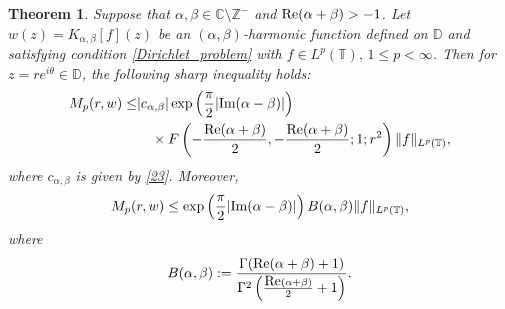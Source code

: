 \documentclass[11pt, reqno]{amsart}
\newtheorem{theorem}{Theorem}
\theoremstyle{definition}
\numberwithin{equation}{section}
\theoremstyle{remark}
\numberwithin{equation}{section}
\begin{document}
	\begin{theorem}\label{Integral mean thm}
		Suppose that $\alpha, \beta\in \mathbb{C}\setminus\mathbb{Z}^-$ and $\mbox{\rm Re}(\alpha+\beta) > -1$. Let $w(z)=K_{\alpha,\beta}[f](z)$ be an $(\alpha,\beta)$-harmonic function defined on  $\mathbb{D}$ and satisfying condition \eqref{Dirichlet_problem} with $f\in L^p(\mathbb{T}),\,1\leq p<\infty$. Then for $z=re^{i\theta}\in \mathbb{D}$, the following sharp inequality holds:
		\begin{align}\begin{split}\label{integral_mean_bound}
			 M_p(r,w)\leq& |c_{\alpha,\beta}|\exp\left(\frac{\pi}{2}| \text{\rm Im}(\alpha-\beta)|\right)\\&\quad \times F\left(-\frac{\mbox{\rm Re}(\alpha+\beta)}{2},-\frac{\mbox{\rm Re}(\alpha+\beta)}{2};1;r^2\right)\|f\|_{L^p(\mathbb{T})},
            \end{split}
		\end{align} where $c_{\alpha,\beta}$ is given by \eqref{23}.
		 Moreover, $$M_p(r,w)\leq \exp\left(\frac{\pi}{2}|\text{\rm Im}(\alpha-\beta)|\right)B(\alpha,\beta)\|f\|_{L^p(\mathbb{T})},$$ where  $$B(\alpha,\beta):=\frac{\Gamma(\mbox{\rm Re}(\alpha+\beta)+1)}{\Gamma^2\left(\frac{\mbox{\rm Re}(\alpha+\beta)}{2}+1\right)}.$$
	\end{theorem}
\end{document}
